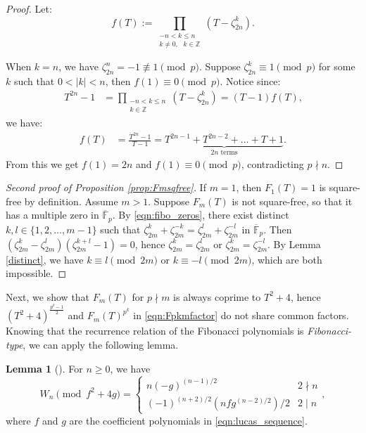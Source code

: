 \documentclass[letterpaper, 10pt]{article}
\newcommand{\bF}{\mathbb{F}}
\newcommand{\1}{\mathds{1}}	%
\theoremstyle{definition}
\newtheorem{lemma}[theorem]{Lemma}
\theoremstyle{remark}
\begin{document}
\begin{proof}
Let:
$$f(T) := \prod_{\substack{-n < k \leq n \\ k \neq 0, \text{ } k \in \mathbb{Z}}} (T - \zeta_{2n}^k) \text{.}$$

When $k = n$, we have $\zeta_{2n}^n = -1 \not \equiv 1 \pmod p$. Suppose $\zeta_{2n}^k \equiv 1 \pmod p$ for some $k$ such that $0 < |k| < n$, then $f(1)\equiv 0\pmod p$.
Notice since:
    \begin{align*}
        T^{2n}-1 &= \prod_{\substack{-n < k \le n \\ k \in \mathbb{Z}}}(T-\zeta_{2n}^k)
        = (T - 1) f(T) \text{,}
    \end{align*}
we have:
\begin{align*}
    f(T) &= \frac{T^{2n} - 1}{T - 1} = \underbrace{T^{2n - 1} + T^{2n - 2} + \dots + T + 1}_{2n \text{ terms}} \text{.}
\end{align*}
From this we get $f(1) = 2n$ and $f(1) \equiv 0 \pmod{p}$, contradicting $p \nmid n$.
\end{proof}

\begin{proof}[Second proof of Proposition \ref{prop:Fmsqfree}]
    If $m = 1$, then $F_1(T) = 1$ is square-free by definition. Assume $m > 1$.
    Suppose $F_m(T)$ is not square-free, so that it has a multiple zero in $\overline{\bF}_p$.
    By \eqref{eqn:fibo_zeros}, there exist distinct $k, l \in \{1, 2, \dots, m - 1\}$ such that $\zeta_{2m}^{k} + \zeta_{2m}^{-k} = \zeta_{2m}^{l} + \zeta_{2m}^{-l}$ in $\overline{\bF}_p$.
    Then $(\zeta_{2m}^{k} - \zeta_{2m}^{l})(\zeta_{2m}^{k + l} - 1) = 0$, hence $\zeta_{2m}^{k} = \zeta_{2m}^{l}$ or $\zeta_{2m}^{k} = \zeta_{2m}^{-l}$.
    By Lemma \ref{distinct}, we have $k \equiv l \pmod{2m}$ or $k \equiv -l \pmod{2m}$, which are both impossible.
\end{proof}

Next, we show that $F_m(T)$ for $p \nmid m$ is always coprime to \(T^2 + 4\), hence $(T^2 + 4)^{\frac{p^k - 1}{2}}$ and $F_m(T)^{p^k}$ in \eqref{eqn:Fpkmfactor} do not share common factors. Knowing that the recurrence relation of the Fibonacci polynomials is \textit{Fibonacci-type}, we can apply the following lemma.

\begin{lemma}[{\cite[Lemma 19]{florez2019resultant}}]
\label{lem:florez_mod}
    For $n \ge 0$, we have
    \begin{equation}
        W_n \pmod{f^2 + 4g} = \begin{cases}
            n (-g)^{(n-1)/2} & 2 \nmid n \\
            (-1)^{(n+2)/2} (nfg^{(n-2)/2}) / 2 & 2 \mid n
        \end{cases}
        ,
    \end{equation}
    where $f$ and $g$ are the coefficient polynomials in \eqref{eqn:lucas_sequence}.
\end{lemma}
\end{document}
